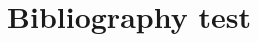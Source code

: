 \documentclass{IEEEtran}
\title{Bibliography test}
\begin{document}
\maketitle

\nocite{*}

\end{document}
